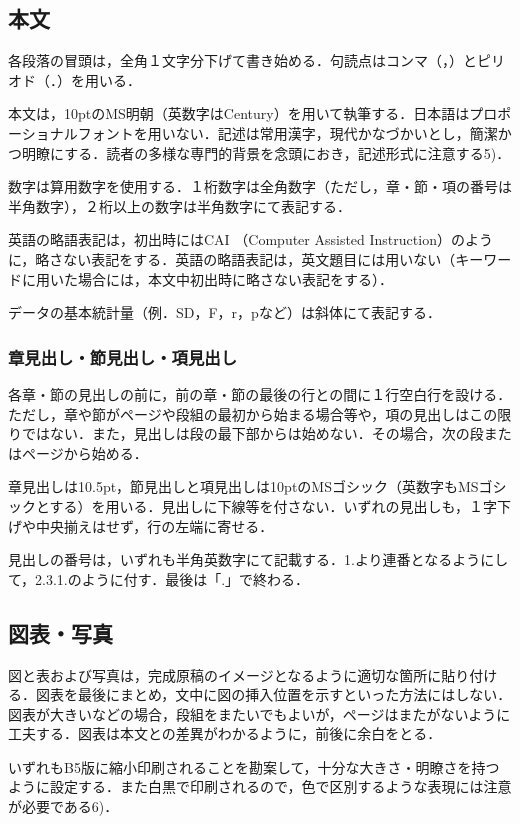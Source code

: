 \documentclass[dvipdfmx]{jset-study-group}
\begin{document}
\subsection{本文}

各段落の冒頭は，全角１文字分下げて書き始める．句読点はコンマ（，）とピリオド（．）を用いる．

本文は，10ptのMS明朝（英数字はCentury）を用いて執筆する．日本語はプロポーショナルフォントを用いない．記述は常用漢字，現代かなづかいとし，簡潔かつ明瞭にする．読者の多様な専門的背景を念頭におき，記述形式に注意する5)．

数字は算用数字を使用する．１桁数字は全角数字（ただし，章・節・項の番号は半角数字），２桁以上の数字は半角数字にて表記する．

英語の略語表記は，初出時にはCAI （Computer Assisted Instruction）のように，略さない表記をする．英語の略語表記は，英文題目には用いない（キーワードに用いた場合には，本文中初出時に略さない表記をする）．

データの基本統計量（例．SD，F，r，pなど）は斜体にて表記する．

\subsubsection{章見出し・節見出し・項見出し}

各章・節の見出しの前に，前の章・節の最後の行との間に１行空白行を設ける．ただし，章や節がページや段組の最初から始まる場合等や，項の見出しはこの限りではない．また，見出しは段の最下部からは始めない．その場合，次の段またはページから始める．

章見出しは10.5pt，節見出しと項見出しは10ptのMSゴシック（英数字もMSゴシックとする）を用いる．見出しに下線等を付さない．いずれの見出しも，１字下げや中央揃えはせず，行の左端に寄せる．

見出しの番号は，いずれも半角英数字にて記載する．1.より連番となるようにして，2.3.1.のように付す．最後は「.」で終わる．

\subsection{図表・写真}

図と表および写真は，完成原稿のイメージとなるように適切な箇所に貼り付ける．図表を最後にまとめ，文中に図の挿入位置を示すといった方法にはしない．図表が大きいなどの場合，段組をまたいでもよいが，ページはまたがないように工夫する．図表は本文との差異がわかるように，前後に余白をとる．

いずれもB5版に縮小印刷されることを勘案して，十分な大きさ・明瞭さを持つように設定する．また白黒で印刷されるので，色で区別するような表現には注意が必要である6)．
\end{document}
